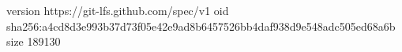 version https://git-lfs.github.com/spec/v1
oid sha256:a4cd8d3e993b37d73f05e42e9ad8b6457526bb4daf938d9e548adc505ed68a6b
size 189130
